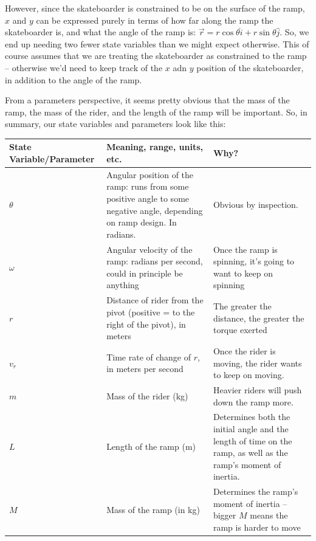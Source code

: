 \documentclass{tufte-handout}
\begin{document}
However, since the skateboarder is constrained to be on the surface of the ramp, $x$ and $y$ can be expressed purely in terms of how far along the ramp the skateboarder is, and what the angle of the ramp is: $\vec{r} = r \cos \theta \hat{i} + r \sin \theta \hat{j}$.  So, we end up needing two fewer state variables than we might expect otherwise.  This of course  assumes that we are treating the skateboarder as constrained to the ramp -- otherwise we'd need to keep track of the $x$ adn $y$ position of the skateboarder, in addition to the angle of the ramp.

From a parameters perspective, it seems pretty obvious that the mass of the ramp, the mass of the rider, and the length of the ramp will be important.  So, in summary, our state variables and parameters look like this:


\begin{center}
\begin{tabular}{ p{3cm} | p{5cm} | p{5cm}}
State Variable/Parameter & Meaning, range, units, etc. & Why? \\
\hline
\hline
$\theta$ & Angular position of the ramp: runs from some positive angle to some negative angle, depending on ramp design. In radians. & Obvious by inspection. \\
\hline
$\omega$ & Angular velocity of the ramp: radians per second, could in principle be anything & Once the ramp is spinning, it's going to want to keep on spinning \\
\hline
$r$ & Distance of rider from the pivot (positive = to the right of the pivot), in meters & The greater the distance, the greater the torque exerted \\
\hline
$v_r$ & Time rate of change of $r$, in meters per second & Once the rider is moving, the rider wants to keep on moving. \\
\hline
\hline
$m$ & Mass of the rider (kg) &Heavier riders will push down the ramp more.\\
\hline
$L$ & Length of the ramp (m) & Determines both the initial angle and the length of time on the ramp, as well as the ramp's moment of inertia.\\
\hline
$M$ & Mass of the ramp (in kg) & Determines the ramp's moment of inertia -- bigger $M$ means the ramp is harder to move\\

\end{tabular}
\end{center}
\end{document}
